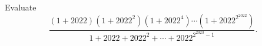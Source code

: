 Evaluate
\[
\dfrac{(1+2022)(1+2022^2)(1+2022^4)\cdots(1+2022^{2^{2022}})}{1+2022+2022^2+\cdots+2022^{2^{2023}-1}}.
\]
